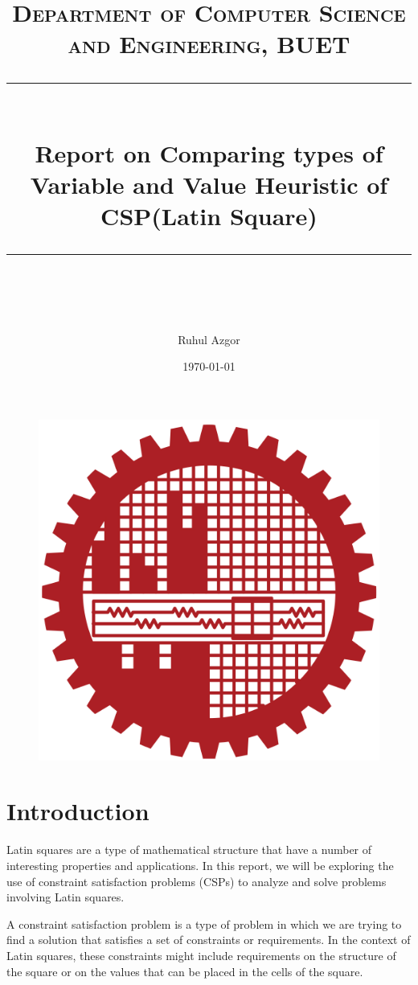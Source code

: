 \documentclass[14pt]{scrartcl} %
\title{	
	\normalfont\normalsize
	\textsc{Department of Computer Science and Engineering, BUET}\\ %
	\vspace{25pt} %
	\rule{\linewidth}{0.5pt}\\ %
	\vspace{20pt} %
	{\huge Report on Comparing types of Variable and Value Heuristic of CSP(Latin Square)}\\ %
	\vspace{12pt} %
	\rule{\linewidth}{2pt}\\ %
	\vspace{12pt} %
}
\author{\LARGE Ruhul Azgor} %
\date{\normalsize\today} %
\begin{document}
\maketitle %


\section*{}

\begin{figure}[h] %
	\centering
	\includegraphics[width=0.5\columnwidth]{Figures/BUET_LOGO.svg.png} %
	 
\end{figure}

\pagebreak
\section{Introduction}
Latin squares are a type of mathematical structure that have a number of interesting properties and applications. In this report, we will be exploring the use of constraint satisfaction problems (CSPs) to analyze and solve problems involving Latin squares.

A constraint satisfaction problem is a type of problem in which we are trying to find a solution that satisfies a set of constraints or requirements. In the context of Latin squares, these constraints might include requirements on the structure of the square or on the values that can be placed in the cells of the square.
\end{document}
